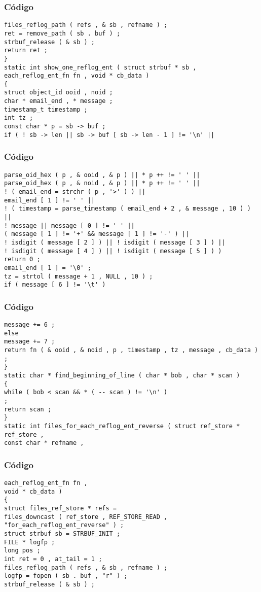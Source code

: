 \documentclass{beamer}
\begin{document}
\begin{frame}[fragile]
\frametitle{C\'odigo}
\begin{verbatim}
files_reflog_path ( refs , & sb , refname ) ; 
ret = remove_path ( sb . buf ) ; 
strbuf_release ( & sb ) ; 
return ret ; 
} 
static int show_one_reflog_ent ( struct strbuf * sb , each_reflog_ent_fn fn , void * cb_data ) 
{ 
struct object_id ooid , noid ; 
char * email_end , * message ; 
timestamp_t timestamp ; 
int tz ; 
const char * p = sb -> buf ; 
if ( ! sb -> len || sb -> buf [ sb -> len - 1 ] != '\n' || 
\end{verbatim}
\end{frame}
\begin{frame}[fragile]
\frametitle{C\'odigo}
\begin{verbatim}
parse_oid_hex ( p , & ooid , & p ) || * p ++ != ' ' || 
parse_oid_hex ( p , & noid , & p ) || * p ++ != ' ' || 
! ( email_end = strchr ( p , '>' ) ) || 
email_end [ 1 ] != ' ' || 
! ( timestamp = parse_timestamp ( email_end + 2 , & message , 10 ) ) || 
! message || message [ 0 ] != ' ' || 
( message [ 1 ] != '+' && message [ 1 ] != '-' ) || 
! isdigit ( message [ 2 ] ) || ! isdigit ( message [ 3 ] ) || 
! isdigit ( message [ 4 ] ) || ! isdigit ( message [ 5 ] ) ) 
return 0 ; 
email_end [ 1 ] = '\0' ; 
tz = strtol ( message + 1 , NULL , 10 ) ; 
if ( message [ 6 ] != '\t' ) 
\end{verbatim}
\end{frame}
\begin{frame}[fragile]
\frametitle{C\'odigo}
\begin{verbatim}
message += 6 ; 
else 
message += 7 ; 
return fn ( & ooid , & noid , p , timestamp , tz , message , cb_data ) ; 
} 
static char * find_beginning_of_line ( char * bob , char * scan ) 
{ 
while ( bob < scan && * ( -- scan ) != '\n' ) 
; 
return scan ; 
} 
static int files_for_each_reflog_ent_reverse ( struct ref_store * ref_store , 
const char * refname , 
\end{verbatim}
\end{frame}
\begin{frame}[fragile]
\frametitle{C\'odigo}
\begin{verbatim}
each_reflog_ent_fn fn , 
void * cb_data ) 
{ 
struct files_ref_store * refs = 
files_downcast ( ref_store , REF_STORE_READ , 
"for_each_reflog_ent_reverse" ) ; 
struct strbuf sb = STRBUF_INIT ; 
FILE * logfp ; 
long pos ; 
int ret = 0 , at_tail = 1 ; 
files_reflog_path ( refs , & sb , refname ) ; 
logfp = fopen ( sb . buf , "r" ) ; 
strbuf_release ( & sb ) ; 
\end{verbatim}
\end{frame}
\end{document}
